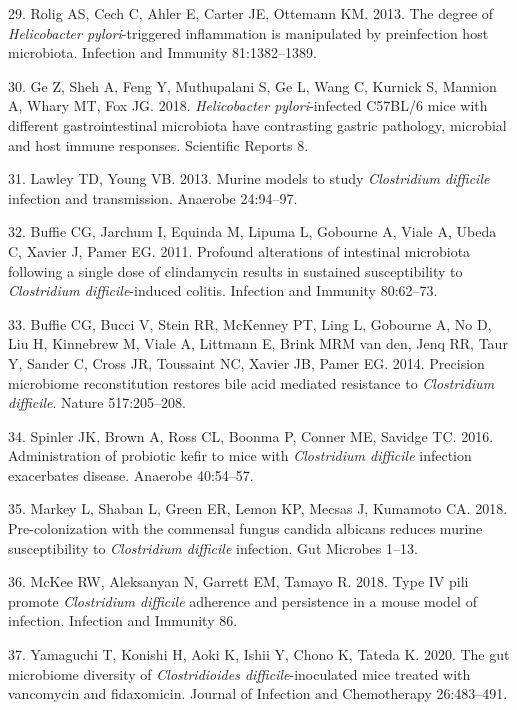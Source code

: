 \documentclass[
  11pt,
]{article}
\begin{document}
\leavevmode\hypertarget{ref-Rolig2013}{}%
29. Rolig AS, Cech C, Ahler E, Carter JE, Ottemann KM. 2013. The degree
of \emph{Helicobacter pylori}-triggered inflammation is manipulated by
preinfection host microbiota. Infection and Immunity 81:1382--1389.

\leavevmode\hypertarget{ref-Ge2018}{}%
30. Ge Z, Sheh A, Feng Y, Muthupalani S, Ge L, Wang C, Kurnick S,
Mannion A, Whary MT, Fox JG. 2018. \emph{Helicobacter pylori}-infected
C57BL/6 mice with different gastrointestinal microbiota have contrasting
gastric pathology, microbial and host immune responses. Scientific
Reports 8.

\leavevmode\hypertarget{ref-Lawley2013}{}%
31. Lawley TD, Young VB. 2013. Murine models to study \emph{Clostridium
difficile} infection and transmission. Anaerobe 24:94--97.

\leavevmode\hypertarget{ref-Buffie2011}{}%
32. Buffie CG, Jarchum I, Equinda M, Lipuma L, Gobourne A, Viale A,
Ubeda C, Xavier J, Pamer EG. 2011. Profound alterations of intestinal
microbiota following a single dose of clindamycin results in sustained
susceptibility to \emph{Clostridium difficile}-induced colitis.
Infection and Immunity 80:62--73.

\leavevmode\hypertarget{ref-Buffie2014}{}%
33. Buffie CG, Bucci V, Stein RR, McKenney PT, Ling L, Gobourne A, No D,
Liu H, Kinnebrew M, Viale A, Littmann E, Brink MRM van den, Jenq RR,
Taur Y, Sander C, Cross JR, Toussaint NC, Xavier JB, Pamer EG. 2014.
Precision microbiome reconstitution restores bile acid mediated
resistance to \emph{Clostridium difficile}. Nature 517:205--208.

\leavevmode\hypertarget{ref-Spinler2016}{}%
34. Spinler JK, Brown A, Ross CL, Boonma P, Conner ME, Savidge TC. 2016.
Administration of probiotic kefir to mice with \emph{Clostridium
difficile} infection exacerbates disease. Anaerobe 40:54--57.

\leavevmode\hypertarget{ref-Markey2018}{}%
35. Markey L, Shaban L, Green ER, Lemon KP, Mecsas J, Kumamoto CA. 2018.
Pre-colonization with the commensal fungus candida albicans reduces
murine susceptibility to \emph{Clostridium difficile} infection. Gut
Microbes 1--13.

\leavevmode\hypertarget{ref-McKee2018}{}%
36. McKee RW, Aleksanyan N, Garrett EM, Tamayo R. 2018. Type IV pili
promote \emph{Clostridium difficile} adherence and persistence in a
mouse model of infection. Infection and Immunity 86.

\leavevmode\hypertarget{ref-Yamaguchi2020}{}%
37. Yamaguchi T, Konishi H, Aoki K, Ishii Y, Chono K, Tateda K. 2020.
The gut microbiome diversity of \emph{Clostridioides
difficile}-inoculated mice treated with vancomycin and fidaxomicin.
Journal of Infection and Chemotherapy 26:483--491.
\end{document}
